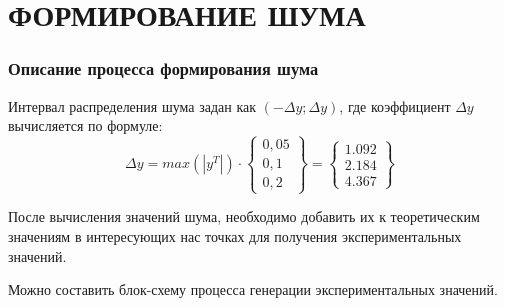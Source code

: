 \part{ФОРМИРОВАНИЕ ШУМА}
    \section*{Описание процесса формирования шума}
        Интервал распределения шума задан как $ (-\Delta y; \Delta y) $, где коэффициент $\Delta y$ вычисляется по формуле:
        $$
            \Delta y = max(|y^{T}|) \cdot
            \begin{Bmatrix}
                0,05 \\
                0,1 \\
                0,2
            \end{Bmatrix}
            =
            \begin{Bmatrix}
                1.092 \\
                2.184 \\
                4.367
            \end{Bmatrix}
        $$

        После вычисления значений шума, необходимо добавить их к теоретическим значениям в интересующих нас точках для получения экспериментальных значений.

        Можно составить блок-схему процесса генерации экспериментальных значений.

